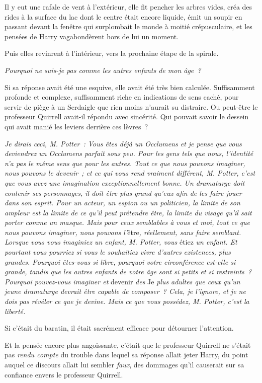 Il y eut une rafale de vent à l'extérieur, elle fit pencher les arbres vides, créa des rides à la surface du lac dont le centre était encore liquide, émit un soupir en passant devant la fenêtre qui surplombait le monde à moitié crépusculaire, et les pensées de Harry vagabondèrent hors de lui un moment.

Puis elles revinrent à l'intérieur, vers la prochaine étape de la spirale.

\emph{Pourquoi ne suis-je pas comme les autres enfants de mon âge~?}

Si sa réponse avait été une esquive, elle avait été très bien calculée. Suffisamment profonde et complexe, suffisamment riche en indications de sens caché, pour servir de piège à un Serdaigle que rien moins n'aurait su distraire. Ou peut-être le professeur Quirrell avait-il répondu avec sincérité. Qui pouvait savoir le dessein qui avait manié les leviers derrière ces lèvres~?

\emph{Je dirais ceci, M. Potter~: Vous êtes déjà un Occlumens et je pense que vous deviendrez un Occlumens parfait sous peu. Pour les gens tels que nous, l'identité n'a pas le même sens que pour les autres. Tout ce que nous pouvons imaginer, nous pouvons le devenir~; et ce qui vous rend vraiment différent, M. Potter, c'est que vous avez une imagination exceptionnellement bonne. Un dramaturge doit contenir ses personnages, il doit être plus grand qu'eux afin de les faire jouer dans son esprit. Pour un acteur, un espion ou un politicien, la limite de son ampleur est la limite de ce qu'il peut prétendre être, la limite du visage qu'il sait porter comme un masque. Mais pour ceux semblables à vous et moi, tout ce que nous pouvons imaginer, nous pouvons l'}être\emph{, réellement, sans faire semblant. Lorsque vous vous imaginiez un enfant, M. Potter, vous} étiez \emph{un enfant. Et pourtant vous pourriez si vous le souhaitiez vivre d'autres existences, plus grandes. Pourquoi êtes-vous si libre, pourquoi votre circonférence est-elle si grande, tandis que les autres enfants de votre âge sont si petits et si restreints~? Pourquoi pouvez-vous imaginer et} devenir \emph{des} Je \emph{plus adultes que ceux qu'un jeune dramaturge devrait être capable de composer~? Cela, je l'ignore, et je ne dois pas révéler ce que je devine. Mais ce que vous possédez, M. Potter, c'est la liberté.}

Si c'était du baratin, il était sacrément efficace pour détourner l'attention.

Et la pensée encore plus angoissante, c'était que le professeur Quirrell ne s'était pas \emph{rendu compte} du trouble dans lequel sa réponse allait jeter Harry, du point auquel ce discours allait lui sembler \emph{faux}, des dommages qu'il causerait sur sa confiance envers le professeur Quirrell.

